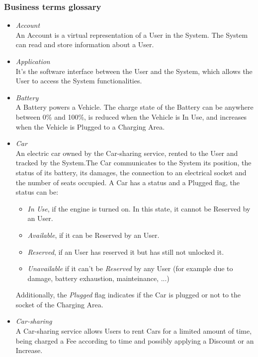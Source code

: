 \subsubsection{Business terms glossary}
\begin{itemize}
	\item \emph{Account} \\
	An Account is a virtual representation of a User in the System. The System can read and store information about a User.
	
	\item \emph{Application} \\
	It's the software interface between the User and the System, which allows the User to access the System functionalities.
	
	\item \emph{Battery} \\
	A Battery powers a Vehicle. The charge state of the Battery can be anywhere between 0\% and 100\%, is reduced when the Vehicle is In Use, and increases when the Vehicle is Plugged to a Charging Area.

	
	\item \emph{Car} \\
	An electric car owned by the Car-sharing service, rented to the User and tracked by the System.The Car communicates to the System its position, the status of its battery, its damages, the connection to an electrical socket and the number of seats occupied. A Car has a status and a Plugged flag, the status can be:
	\begin{itemize}
		\item \textit{In Use}, if the engine is turned on. In this state, it cannot be Reserved by an User.
		\item \textit{Available}, if it can be Reserved by an User.
		\item \textit{Reserved}, if an User has reserved it but has still not unlocked it.
		\item \textit{Unavailable} if it can't be \textit{Reserved} by any User (for example due to damage, battery exhaustion, mainteinance, ...)
	\end{itemize}
	Additionally, the \textit{Plugged} flag indicates if the {Car} is plugged or not to the socket of the Charging Area.
	
	\item \emph{Car-sharing} \\
	A Car-sharing service allows Users to rent Cars for a limited amount of time, being charged a Fee according to time and possibly applying a Discount or an Increase.
	

\end{itemize}
